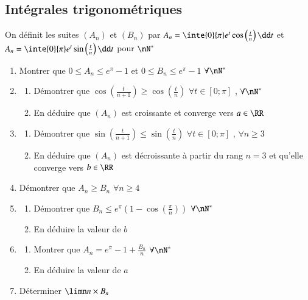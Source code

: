 \documentclass[oneside,12pt]{article}          %
\begin{document}
\subsection{Intégrales trigonométriques}
On définit les suites $(A_n)$ et $(B_n)$ par $A_n=\inte{0}{\pi}e^t\cos\left(\frac{t}{n}\right)\dd t$ et $A_n=\inte{0}{\pi}e^t\sin\left(\frac{t}{n}\right)\dd t$ \quad pour $\nN^*$
\begin{enumerate}\setlength{\itemsep}{0pt}
    \item Montrer que $0\leq A_n\leq e^\pi-1$ \quad et \quad $0\leq B_n\leq e^\pi-1$ \quad $\forall\nN^*$
    \item \begin{enumerate}
        \item Démontrer que $\cos\left(\frac{t}{n+1}\right)\geq\cos\left(\frac{t}{n}\right)$ \quad $\forall t\in[0;\pi]$ , \quad $\forall\nN^*$
        \item En déduire que $(A_n)$ est croissante et converge vers $a\in\RR$
    \end{enumerate}
    \item \begin{enumerate}
        \item Démontrer que $\sin\left(\frac{t}{n+1}\right)\leq\sin\left(\frac{t}{n}\right)$ \quad $\forall t\in[0;\pi]$ , \quad $\forall n\geq3$
        \item En déduire que $(A_n)$ est décroissante à partir du rang $n=3$ et qu'elle converge vers $b\in\RR$
    \end{enumerate}
    \item Démontrer que $A_n\geq B_n$ \quad $\forall n\geq 4$
    \item \begin{enumerate}
        \item Démontrer que $B_n\leq e^\pi\left(1-\cos\left(\frac{\pi}{n}\right)\right)$ \quad $\forall\nN^*$
        \item En déduire la valeur de $b$
    \end{enumerate}
    \item \begin{enumerate}
        \item Montrer que $A_n=e^\pi-1+\frac{B_n}{n}$ \quad $\forall\nN^*$
        \item En déduire la valeur de $a$
    \end{enumerate}
    \item Déterminer $\limn n\times B_n$ 
\end{enumerate}
\end{document}
